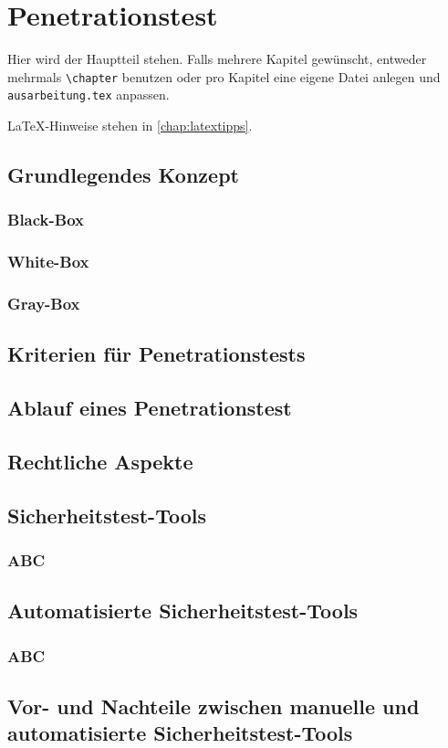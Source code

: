 \chapter{Penetrationstest}
\label{chap:k2}

Hier wird der Hauptteil stehen. Falls mehrere Kapitel gewünscht, entweder mehrmals \texttt{\textbackslash{}chapter} benutzen oder pro Kapitel eine eigene Datei anlegen und \texttt{ausarbeitung.tex} anpassen.

LaTeX-Hinweise stehen in \cref{chap:latextipps}.

\section{Grundlegendes Konzept}

\subsection{Black-Box}

\subsection{White-Box}

\subsection{Gray-Box}

\section{Kriterien für Penetrationstests}

\section{Ablauf eines Penetrationstest}

\section{Rechtliche Aspekte}

\section{Sicherheitstest-Tools}

\subsection{ABC}

\section{Automatisierte Sicherheitstest-Tools}

\subsection{ABC}

\section{Vor- und Nachteile zwischen manuelle und automatisierte Sicherheitstest-Tools}
